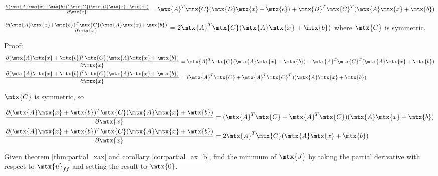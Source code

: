 \begin{theorem}
  $\frac{\partial (\mtx{A}\mtx{x} + \mtx{b})^T\mtx{C}
    (\mtx{D}\mtx{x} + \mtx{e})}{\partial\mtx{x}} =
    \mtx{A}^T\mtx{C}(\mtx{D}\mtx{x} + \mtx{e}) + \mtx{D}^T\mtx{C}^T
    (\mtx{A}\mtx{x} + \mtx{b})$
\end{theorem}

\begin{corollary}
  \label{cor:partial_ax_b}

  $\frac{\partial (\mtx{A}\mtx{x} + \mtx{b})^T\mtx{C}
    (\mtx{A}\mtx{x} + \mtx{b})}{\partial\mtx{x}} =
    2\mtx{A}^T\mtx{C}(\mtx{A}\mtx{x} + \mtx{b})$ where $\mtx{C}$ is symmetric.

  Proof:
  \begin{align*}
    \frac{\partial (\mtx{A}\mtx{x} + \mtx{b})^T\mtx{C}
      (\mtx{A}\mtx{x} + \mtx{b})}{\partial\mtx{x}} &=
      \mtx{A}^T\mtx{C}(\mtx{A}\mtx{x} + \mtx{b}) + \mtx{A}^T\mtx{C}^T
      (\mtx{A}\mtx{x} + \mtx{b}) \\
    \frac{\partial (\mtx{A}\mtx{x} + \mtx{b})^T\mtx{C}
      (\mtx{A}\mtx{x} + \mtx{b})}{\partial\mtx{x}} &=
      (\mtx{A}^T\mtx{C} + \mtx{A}^T\mtx{C}^T)(\mtx{A}\mtx{x} + \mtx{b})
  \end{align*}

  $\mtx{C}$ is symmetric, so

  \begin{align*}
    \frac{\partial (\mtx{A}\mtx{x} + \mtx{b})^T\mtx{C}
      (\mtx{A}\mtx{x} + \mtx{b})}{\partial\mtx{x}} &=
      (\mtx{A}^T\mtx{C} + \mtx{A}^T\mtx{C})(\mtx{A}\mtx{x} + \mtx{b}) \\
    \frac{\partial (\mtx{A}\mtx{x} + \mtx{b})^T\mtx{C}
      (\mtx{A}\mtx{x} + \mtx{b})}{\partial\mtx{x}} &=
      2\mtx{A}^T\mtx{C}(\mtx{A}\mtx{x} + \mtx{b})
  \end{align*}
\end{corollary}

Given theorem \ref{thm:partial_xax} and corollary \ref{cor:partial_ax_b}, find
the minimum of $\mtx{J}$ by taking the partial derivative with respect to
$\mtx{u}_{ff}$ and setting the result to $\mtx{0}$.

